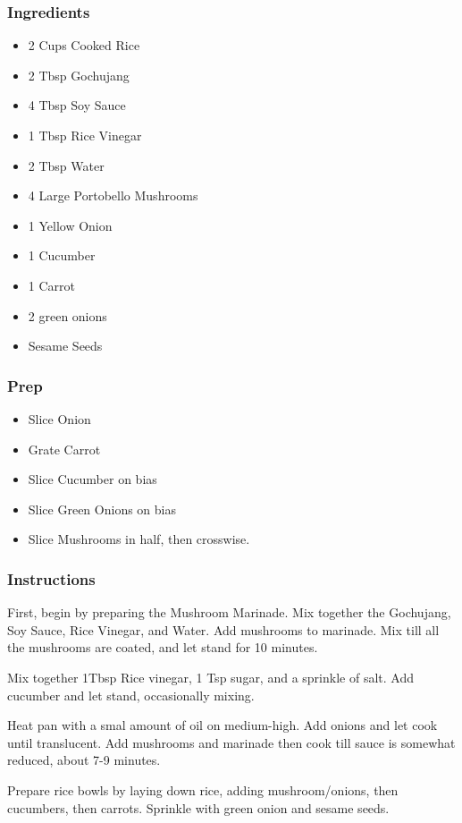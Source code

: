 \documentclass[11pt]{article}
\begin{document}
\subsubsection{Ingredients}
\label{sec:org0bf96cd}
\begin{itemize}
\item 2 Cups Cooked Rice
\item 2 Tbsp Gochujang
\item 4 Tbsp Soy Sauce
\item 1 Tbsp Rice Vinegar
\item 2 Tbsp Water
\item 4 Large Portobello Mushrooms
\item 1 Yellow Onion
\item 1 Cucumber
\item 1 Carrot
\item 2 green onions
\item Sesame Seeds
\end{itemize}
\subsubsection{Prep}
\label{sec:org59aa65f}
\begin{itemize}
\item Slice Onion
\item Grate Carrot
\item Slice Cucumber on bias
\item Slice Green Onions on bias
\item Slice Mushrooms in half, then crosswise.
\end{itemize}
\subsubsection{Instructions}
\label{sec:orga21e61b}
First, begin by preparing the Mushroom Marinade. Mix together the
Gochujang, Soy Sauce, Rice Vinegar, and Water. Add mushrooms to marinade.
Mix till all the mushrooms are coated, and let stand for 10 minutes.

Mix together 1Tbsp Rice vinegar, 1 Tsp sugar, and a sprinkle of
salt. Add cucumber and let stand, occasionally mixing.

Heat pan with a smal amount of oil on medium-high. Add onions and let cook
until translucent. Add mushrooms and marinade then cook till sauce
is somewhat reduced, about 7-9 minutes.

Prepare rice bowls by laying down rice, adding mushroom/onions,
then cucumbers, then carrots. Sprinkle with green onion and sesame seeds.
\end{document}
